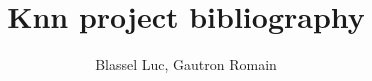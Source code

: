 \documentclass[12pt]{article}
\title{Knn project bibliography}
\author{Blassel Luc, Gautron Romain}
\begin{document}
\maketitle

\nocite{*}


\end{document}
